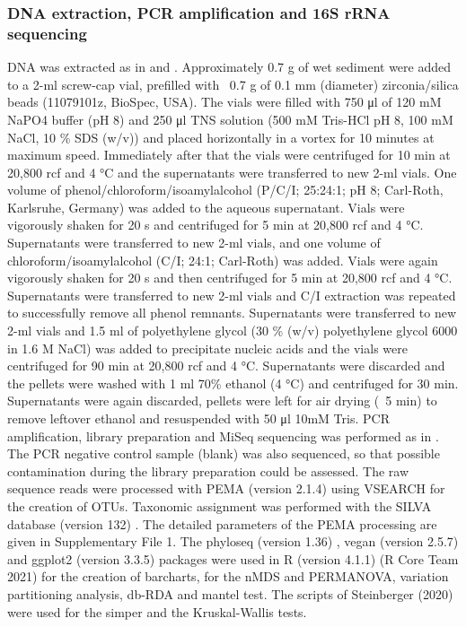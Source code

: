 \subsubsection*{DNA extraction, PCR amplification and 16S rRNA sequencing}

   DNA was extracted as in \citep{henckel_molecular_1999} and \citep{lueders_enhanced_2004}. 
   Approximately 0.7 g of wet sediment were added to a 2-ml screw-cap vial, prefilled with ~0.7 g of 0.1 mm (diameter) zirconia/silica beads (11079101z, BioSpec, USA). 
   The vials were filled with 750 μl of 120 mM NaPO4 buffer (pH 8) and 250 μl TNS solution (500 mM Tris-HCl pH 8, 100 mM NaCl, 10 \% SDS (w/v)) and placed horizontally in a vortex for 10 minutes at maximum speed. 
   Immediately after that the vials were centrifuged for 10 min at 20,800 rcf and 4 °C and the supernatants were transferred to new 2-ml vials. 
   One volume of phenol/chloroform/isoamylalcohol (P/C/I; 25:24:1; pH 8; Carl-Roth, Karlsruhe, Germany) was added to the aqueous supernatant. 
   Vials were vigorously shaken for 20 s and centrifuged for 5 min at 20,800 rcf and 4 °C. 
   Supernatants were transferred to new 2-ml vials, and one volume of chloroform/isoamylalcohol (C/I; 24:1; Carl-Roth) was added. 
   Vials were again vigorously shaken for 20 s and then centrifuged for 5 min at 20,800 rcf and 4 °C. 
   Supernatants were transferred to new 2-ml vials and C/I extraction was repeated to successfully remove all phenol remnants. 
   Supernatants were transferred to new 2-ml vials and 1.5 ml of polyethylene glycol (30 \% (w/v) polyethylene glycol 6000 in 1.6 M NaCl) was added to precipitate nucleic acids and the vials were centrifuged for 90 min at 20,800 rcf and 4 °C. 
   Supernatants were discarded and the pellets were washed with 1 ml 70\% ethanol (4 °C) and centrifuged for 30 min. 
   Supernatants were again discarded, pellets were left for air drying (~5 min) to remove leftover ethanol and resuspended with 50 μl 10mM Tris. 
   PCR amplification, library preparation and MiSeq sequencing was performed as in \citep{pavloudi2017sediment}. 
   The PCR negative control sample (blank) was also sequenced, so that possible contamination during the library preparation could be assessed. 
   The raw sequence reads were processed with PEMA (version 2.1.4) \citep{zafeiropoulos2020pema} using VSEARCH for the creation of OTUs. 
   Taxonomic assignment was performed with the SILVA database (version 132) \citep{quast_silva_2013}. 
   The detailed parameters of the PEMA processing are given in Supplementary File 1. 
   The phyloseq (version 1.36) \citep{mcmurdie2013phyloseq}, vegan (version  2.5.7) \citep{oksanen_vegan_2020} and ggplot2 (version 3.3.5) \citep{wickham2016package} 
   packages were used in R (version 4.1.1) (R Core Team 2021) for the creation of barcharts, for the nMDS and PERMANOVA, variation partitioning analysis, db-RDA and mantel test. 
   The scripts of Steinberger (2020) \citep{steinberger_asteinberger9seq_scripts_2020} were used for the simper and the Kruskal-Wallis tests. 


